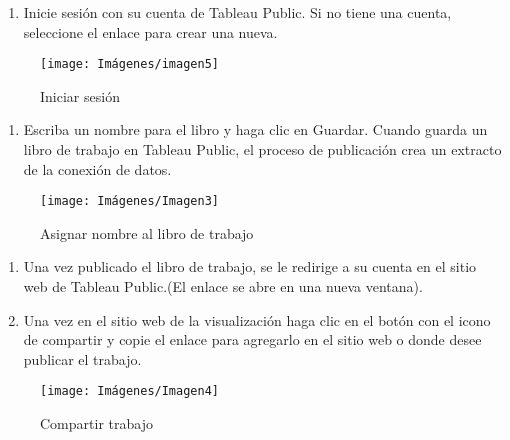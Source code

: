 \documentclass[
]{book}
\providecommand{\tightlist}{%
  \setlength{\itemsep}{0pt}\setlength{\parskip}{0pt}}
\begin{document}
\begin{enumerate}
\def\labelenumi{\arabic{enumi}.}
\setcounter{enumi}{1}
\tightlist
\item
  Inicie sesión con su cuenta de Tableau Public. Si no tiene una cuenta, seleccione el enlace para crear una nueva.
\end{enumerate}

\begin{figure}

{\centering \texttt{[image: Imágenes/imagen5]} 

}

\caption{Iniciar sesión}\label{fig:iniciosesion-fig}
\end{figure}

\begin{enumerate}
\def\labelenumi{\arabic{enumi}.}
\setcounter{enumi}{2}
\tightlist
\item
  Escriba un nombre para el libro y haga clic en Guardar. Cuando guarda un libro de trabajo en Tableau Public, el proceso de publicación crea un extracto de la conexión de datos.
\end{enumerate}

\begin{figure}

{\centering \texttt{[image: Imágenes/Imagen3]} 

}

\caption{Asignar nombre al libro de trabajo}\label{fig:nombrelibro-fig}
\end{figure}

\begin{enumerate}
\def\labelenumi{\arabic{enumi}.}
\setcounter{enumi}{3}
\tightlist
\item
  Una vez publicado el libro de trabajo, se le redirige a su cuenta en el sitio web de Tableau Public.(El enlace se abre en una nueva ventana).
\item
  Una vez en el sitio web de la visualización haga clic en el botón con el icono de compartir y copie el enlace para agregarlo en el sitio web o donde desee publicar el trabajo.
\end{enumerate}

\begin{figure}

{\centering \texttt{[image: Imágenes/Imagen4]} 

}

\caption{Compartir trabajo}\label{fig:compartir-fig}
\end{figure}
\end{document}
